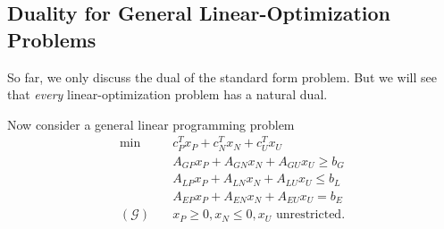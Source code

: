 \subsection{Duality for General Linear-Optimization Problems}
So far, we only discuss the dual of the standard form problem. But we will see that \emph{every} linear-optimization problem has a natural dual.

Now consider a general linear programming problem
\begin{align*}
	\min~              & c^{T}_P x_P + c^{T}_N x_N + c^{T}_U x_U          \\
	                   & A_{GP}x_P +A_{GN}x_N + A_{GU}x_U\geq b_G         \\
	                   & A_{LP}x_P +A_{LN}x_N + A_{LU}x_U \leq b_L        \\
	                   & A_{EP}x_P +A_{EN}x_N + A_{EU}x_U = b_E           \\
	(\mathcal{G})\quad & x_P\geq 0, x_N \leq 0, x_U \text{ unrestricted}.
\end{align*}

